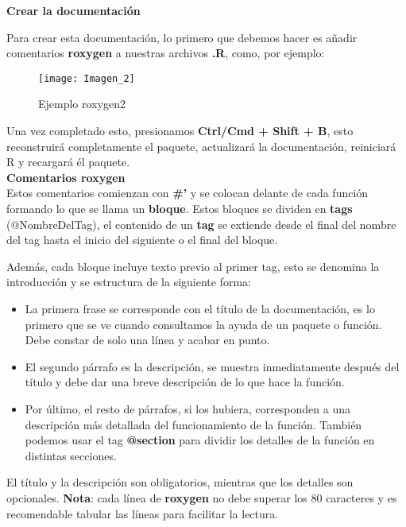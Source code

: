 \textbf{Crear la documentaci\'on}

Para crear esta documentaci\'on, lo primero que debemos hacer es a\~nadir comentarios
\textbf{roxygen} a nuestras archivos \textbf{.R}, como, por ejemplo:

\begin{figure}[H]
    \centering
    \texttt{[image: Imagen\_2]}
    \caption{Ejemplo roxygen2   }
    \label{fig:roxygen2}
\end{figure} 

Una vez completado esto, presionamos \textbf{Ctrl/Cmd + Shift + B}, esto reconstruir\'a
completamente el paquete, actualizar\'a la documentaci\'on, reiniciar\'a R y recargar\'a \'el
paquete. \\

\textbf{Comentarios roxygen} \\
Estos comentarios comienzan con \textbf{\#'} y se colocan delante de cada funci\'on formando lo que
se llama un \textbf{bloque}. Estos bloques se dividen en \textbf{tags} (@NombreDelTag), el contenido de un
\textbf{tag} se extiende desde el final del nombre del tag hasta el inicio del siguiente o el final del
bloque.

Adem\'as, cada bloque incluye texto previo al primer tag, esto se denomina la introducci\'on y
se estructura de la siguiente forma:

\begin{itemize}
    \item La primera frase se corresponde con el t\'itulo de la documentaci\'on, es lo primero que
se ve cuando consultamos la ayuda de un paquete o funci\'on. Debe constar de solo
una l\'inea y acabar en punto.
    \item El segundo p\'arrafo es la descripci\'on, se muestra inmediatamente despu\'es del t\'itulo y
debe dar una breve descripci\'on de lo que hace la funci\'on.
    \item Por \'ultimo, el resto de p\'arrafos, si los hubiera, corresponden a una descripci\'on m\'as
detallada del funcionamiento de la funci\'on. Tambi\'en podemos usar el tag \textbf{@section}
para dividir los detalles de la funci\'on en distintas secciones.
\end{itemize}

El t\'itulo y la descripci\'on son obligatorios, mientras que los detalles son opcionales.
\textbf{Nota}: cada l\'inea de \textbf{roxygen} no debe superar los 80 caracteres y es recomendable tabular
las l\'ineas para facilitar la lectura.\\

